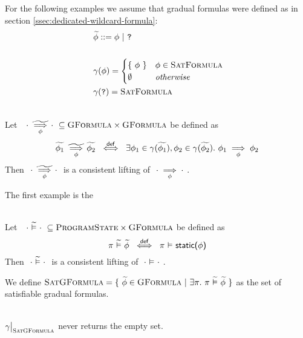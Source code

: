 For the following examples we assume that gradual formulas were defined as in section \ref{ssec:dedicated-wildcard-formula}:
\begin{align*}
&\widetilde{\phi} ::= \phi ~|~ \textup{\texttt{?}} \\
~\\
&\gamma(\phi) = 
\begin{cases}
\{~ \phi ~\}  & \phi \in \textup{\textsc{SatFormula}}\\
\emptyset     & \textit{otherwise}
\end{cases}\\
&\gamma(\textup{\texttt{?}}) = \textup{\textsc{SatFormula}}
\end{align*}

\begin{lemma}~\\
    Let $~~{\cdot} \,\,\underset{\phi}{\widetilde{\implies}}\, {\cdot}~ \subseteq \textup{\textsc{GFormula}} \times \textup{\textsc{GFormula}}$ be defined as
    \begin{displaymath} 
    {\widetilde{\phi_1}} \,\,\underset{\phi}{\widetilde{\implies}}\, {\widetilde{\phi_2}} ~\overset{\textup{\textsf{def}}}{\iff}~ \exists \phi_1 \in \gamma(\widetilde{\phi_1}), \phi_2 \in \gamma(\widetilde{\phi_2}).~ {\phi_1} \underset{\phi}{\implies} {\phi_2}
    \end{displaymath}
    Then $~{\cdot} \,\,\underset{\phi}{\widetilde{\implies}}\, {\cdot}~$ is a consistent lifting of $~{\cdot} \underset{\phi}{\implies} {\cdot}~$.
\end{lemma}

The first example is the 
\begin{lemma}~\\
    Let $~~\cdot \,\,\widetilde{\vDash}\,\, \cdot~ \subseteq \textup{\textsc{ProgramState}} \times \textup{\textsc{GFormula}}$ be defined as
    \begin{displaymath} 
    \pi \,\,\widetilde{\vDash}\,\, \widetilde{\phi} ~\overset{\textup{\textsf{def}}}{\iff}~ \pi \,\,{\vDash}\,\, \textup{\textsf{static($\phi$)}}
    \end{displaymath}
    Then $~\cdot \,\,\widetilde{\vDash}\,\, \cdot~$ is a consistent lifting of $~\cdot \,\,{\vDash}\,\, \cdot~$.
\end{lemma}

We define $\textup{\textsc{SatGFormula}} = \{~ \widetilde{\phi} \in \textup{\textsc{GFormula}} ~|~ \exists \pi.~ \pi \,\,\widetilde{\vDash}\,\, \widetilde{\phi} ~\}$ as the set of satisfiable gradual formulas.

\begin{lemma}~\\
    $\restr{\gamma}{\setGFormulaA}$ never returns the empty set.
\end{lemma}



